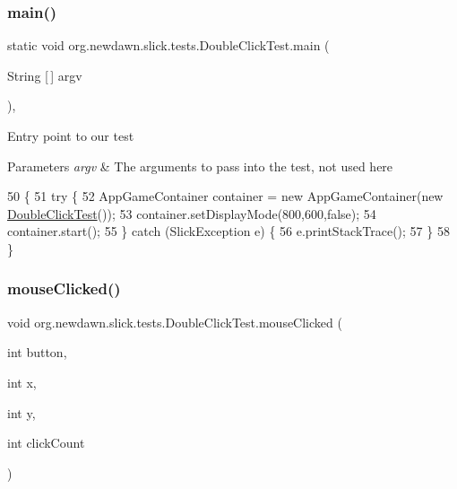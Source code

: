 \subsubsection{\texorpdfstring{main()}{main()}}
{\footnotesize\ttfamily static void org.\+newdawn.\+slick.\+tests.\+Double\+Click\+Test.\+main (\begin{DoxyParamCaption}\item[{String \mbox{[}$\,$\mbox{]}}]{argv }\end{DoxyParamCaption})\hspace{0.3cm}{\ttfamily [inline]}, {\ttfamily [static]}}

Entry point to our test


\begin{DoxyParams}{Parameters}
{\em argv} & The arguments to pass into the test, not used here \\
\hline
\end{DoxyParams}

\begin{DoxyCode}
50                                            \{
51         \textcolor{keywordflow}{try} \{
52             AppGameContainer container = \textcolor{keyword}{new} AppGameContainer(\textcolor{keyword}{new} 
      \mbox{\hyperlink{classorg_1_1newdawn_1_1slick_1_1tests_1_1_double_click_test_ad24f50877789bacdf4cae61677529ca5}{DoubleClickTest}}());
53             container.setDisplayMode(800,600,\textcolor{keyword}{false});
54             container.start();
55         \} \textcolor{keywordflow}{catch} (SlickException e) \{
56             e.printStackTrace();
57         \}
58     \}
\end{DoxyCode}
\mbox{\label{classorg_1_1newdawn_1_1slick_1_1tests_1_1_double_click_test_a38920aa6fbd2b5ec525f229bcc2a7769}} 
\subsubsection{\texorpdfstring{mouse\+Clicked()}{mouseClicked()}}
{\footnotesize\ttfamily void org.\+newdawn.\+slick.\+tests.\+Double\+Click\+Test.\+mouse\+Clicked (\begin{DoxyParamCaption}\item[{int}]{button,  }\item[{int}]{x,  }\item[{int}]{y,  }\item[{int}]{click\+Count }\end{DoxyParamCaption})\hspace{0.3cm}{\ttfamily [inline]}}

